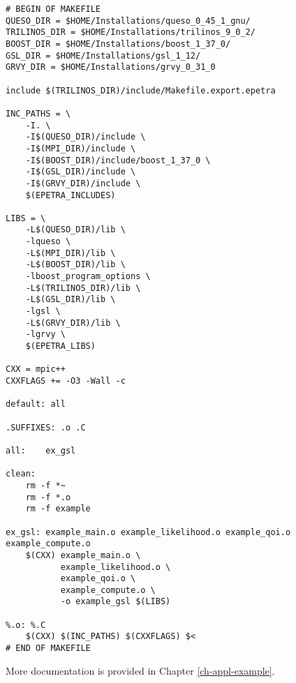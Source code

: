 \begin{lstlisting}[label={},caption={},deletekeywords={export,rm}]
# BEGIN OF MAKEFILE
QUESO_DIR = $HOME/Installations/queso_0_45_1_gnu/
TRILINOS_DIR = $HOME/Installations/trilinos_9_0_2/
BOOST_DIR = $HOME/Installations/boost_1_37_0/
GSL_DIR = $HOME/Installations/gsl_1_12/
GRVY_DIR = $HOME/Installations/grvy_0_31_0

include $(TRILINOS_DIR)/include/Makefile.export.epetra

INC_PATHS = \
	-I. \
	-I$(QUESO_DIR)/include \
	-I$(MPI_DIR)/include \
	-I$(BOOST_DIR)/include/boost_1_37_0 \
	-I$(GSL_DIR)/include \
	-I$(GRVY_DIR)/include \
	$(EPETRA_INCLUDES)

LIBS = \
	-L$(QUESO_DIR)/lib \
	-lqueso \
	-L$(MPI_DIR)/lib \
	-L$(BOOST_DIR)/lib \
	-lboost_program_options \
    -L$(TRILINOS_DIR)/lib \
	-L$(GSL_DIR)/lib \
	-lgsl \
	-L$(GRVY_DIR)/lib \
	-lgrvy \
	$(EPETRA_LIBS)

CXX = mpic++
CXXFLAGS += -O3 -Wall -c

default: all

.SUFFIXES: .o .C

all:	ex_gsl

clean:
	rm -f *~
	rm -f *.o
	rm -f example

ex_gsl: example_main.o example_likelihood.o example_qoi.o example_compute.o
	$(CXX) example_main.o \
	       example_likelihood.o \
	       example_qoi.o \
	       example_compute.o \
	       -o example_gsl $(LIBS)

%.o: %.C
	$(CXX) $(INC_PATHS) $(CXXFLAGS) $<
# END OF MAKEFILE
\end{lstlisting}

More documentation is provided in Chapter \ref{ch-appl-example}.
